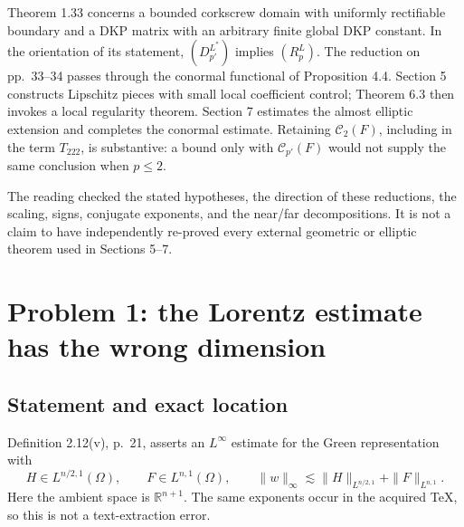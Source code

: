 \documentclass[10pt]{article}
\begin{document}
Theorem 1.33 concerns a bounded corkscrew domain with uniformly rectifiable boundary and a DKP matrix with an arbitrary finite global DKP constant. In the orientation of its statement, \((D^{L^*}_{p'})\) implies \((R^L_p)\). The reduction on pp. 33–34 passes through the conormal functional of Proposition 4.4. Section 5 constructs Lipschitz pieces with small local coefficient control; Theorem 6.3 then invokes a local regularity theorem. Section 7 estimates the almost elliptic extension and completes the conormal estimate. Retaining \(\mathcal C_2(F)\), including in the term \(T_{222}\), is substantive: a bound only with \(\mathcal C_{p'}(F)\) would not supply the same conclusion when \(p\leq2\).\par
The reading checked the stated hypotheses, the direction of these reductions, the scaling, signs, conjugate exponents, and the near/far decompositions. It is not a claim to have independently re-proved every external geometric or elliptic theorem used in Sections 5–7.\par
\section*{Problem 1: the Lorentz estimate has the wrong dimension}
\subsection*{Statement and exact location}
Definition 2.12(v), p. 21, asserts an \(L^\infty\) estimate for the Green representation with \[H\in L^{n/2,1}(\Omega),\qquad F\in L^{n,1}(\Omega),
 \qquad
 \|w\|_\infty\lesssim
 \|H\|_{L^{n/2,1}}+\|F\|_{L^{n,1}}.\] Here the ambient space is \(\mathbb R^{n+1}\). The same exponents occur in the acquired TeX, so this is not a text-extraction error.\par
\end{document}
